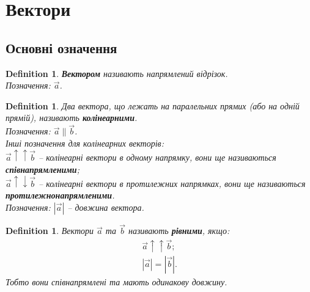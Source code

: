 \documentclass[a4paper, 10pt]{extarticle}
\theoremstyle{theoremdd}
\theoremstyle{theoremdd}
\newtheorem{definition}[theorem]{Definition}
\theoremstyle{theoremdd}
\theoremstyle{theoremdd}
\theoremstyle{theoremdd}
\theoremstyle{theoremdd}
\theoremstyle{theoremdd}
\theoremstyle{theoremdd}
\begin{document}
\tableofcontents
\newpage
	
\section{Вектори}
\subsection{Основні означення}
\begin{definition}
\textbf{Вектором} називають напрямлений відрізок.\\
Позначення: $\vec{a}$.
\begin{figure}[h]
\centering
{}
\end{figure}
\end{definition}

\begin{definition}
Два вектора, що лежать на паралельних прямих (або на одній прямій), називають \textbf{колінеарними}.\\
Позначення: $\vec{a} \parallel \vec{b}$.\\
Інші позначення для колінеарних векторів: \\ 
$\vec{a} \uparrow \uparrow \vec{b}$ -- колінеарні вектори в одному напрямку, вони ще називаються \textbf{співнапрямленими};\\
$\vec{a} \uparrow \downarrow \vec{b}$ -- колінеарні вектори в протилежних напрямках, вони ще називаються \textbf{протилежнонапрямленими}.
\bigskip \\
Позначення: $|\vec{a}|$ -- довжина вектора.
\end{definition}

\begin{definition}
Вектори $\vec{a}$ та $\vec{b}$ називають \textbf{рівними}, якщо:
	\begin{align*}
	\vec{a} \uparrow \uparrow \vec{b};\\
	|\vec{a}| = |\vec{b}|.
	\end{align*}
	Тобто вони співнапрямлені та мають одинакову довжину.
\end{definition}
\end{document}
